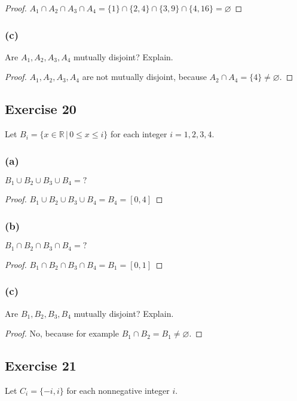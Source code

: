 \documentclass[14pt]{extarticle}
\newcommand{\es}{\varnothing}
\newcommand{\R}{\mathbb{R}}
\begin{document}
\begin{proof}
  \(A_1 \cap A_2 \cap A_3 \cap A_4 = \{1\} \cap \{2, 4\} \cap \{3, 9\} \cap \{4, 16\} = \es\)
\end{proof}

\subsubsection{(c)}
Are \(A_1, A_2, A_3, A_4\) mutually disjoint? Explain.

\begin{proof}
  \(A_1, A_2, A_3, A_4\) are not mutually disjoint, because \(A_2 \cap A_4 = \{4\} \neq \es\).
\end{proof}

\subsection{Exercise 20}
Let \(B_i = \{x \in \R \, | \, 0 \leq x \leq i\}\) for each integer \(i = 1, 2, 3, 4\).

\subsubsection{(a)}
\(B_1 \cup B_2 \cup B_3 \cup B_4 = ?\)

\begin{proof}
  \(B_1 \cup B_2 \cup B_3 \cup B_4 = B_4 = [0, 4]\)
\end{proof}

\subsubsection{(b)}
\(B_1 \cap B_2 \cap B_3 \cap B_4 = ?\)

\begin{proof}
  \(B_1 \cap B_2 \cap B_3 \cap B_4 = B_1 = [0, 1]\)
\end{proof}

\subsubsection{(c)}
Are \(B_1, B_2, B_3, B_4\) mutually disjoint? Explain.

\begin{proof}
  No, because for example \(B_1 \cap B_2 = B_1 \neq \es\).
\end{proof}

\subsection{Exercise 21}
Let \(C_i = \{-i, i\}\) for each nonnegative integer $i$.
\end{document}
